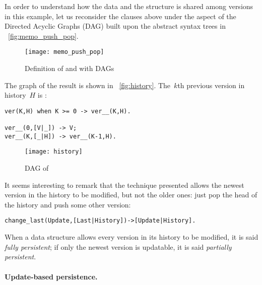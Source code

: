 In order to understand how the data and the structure is shared among
versions in this example, let us reconsider the clauses above under
the aspect of the Directed Acyclic Graphs (DAG) built upon the
abstract syntax trees in \fig~\vref{fig:memo_push_pop}.
\begin{figure}[t]
\centering
\texttt{[image: memo\_push\_pop]}
\caption{Definition of  and  with DAGs
\label{fig:memo_push_pop}}
\end{figure}
The graph of the result is shown in
\fig~\vref{fig:history}. The~\(k\)th previous version in history~\(H\)
is :
\begin{verbatim}
ver(K,H) when K >= 0 -> ver__(K,H).

ver__(0,[V|_]) -> V;
ver__(K,[_|H]) -> ver__(K-1,H).
\end{verbatim}
\begin{figure}[t]
\centering
\texttt{[image: history]}
\caption{DAG of \erlcode{[[d,b,a],[b,a],[c,b,a],[b,a],[a],[]]}\label{fig:history}}
\end{figure}
It seems interesting to remark that the technique presented allows the
newest version in the history to be modified, but not the older ones:
just pop the head of the history and push some other version:
\begin{alltt}
change_last(Update,[Last|History]) -> [Update|History].
\end{alltt}
When a data structure allows every version in its history to be
modified, it is said \emph{fully persistent}; if only the newest
version is updatable, it is said \emph{partially persistent}. 

\medskip

\paragraph{Update\hyp{}based persistence.}
\label{update_based_persistence}


